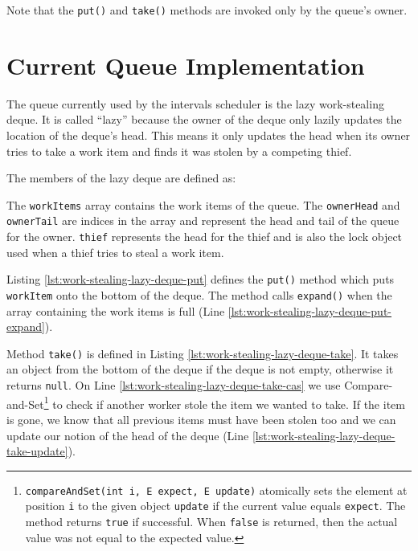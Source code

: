 Note that the \lstinline!put()! and \lstinline!take()! methods are
invoked only by the queue's owner.


\section{Current Queue Implementation}
\label{sec:queues-background-current-implementation}

The queue currently used by the intervals scheduler is the lazy
work-stealing deque. It is called ``lazy'' because the owner of the
deque only lazily updates the location of the deque's head. This means
it only updates the head when its owner tries to take a work item and
finds it was stolen by a competing thief.

The members of the lazy deque are defined as:



The \lstinline!workItems! array contains the work items of the
queue. The \lstinline!ownerHead! and \lstinline!ownerTail! are indices
in the array and represent the head and tail of the queue for the
owner. \lstinline!thief! represents the head for the thief and is also
the lock object used when a thief tries to steal a work item.

Listing \ref{lst:work-stealing-lazy-deque-put} defines the
\lstinline!put()! method which puts \lstinline!workItem! onto the
bottom of the deque. The method calls \lstinline!expand()! when the
array containing the work items is full (Line
\ref{lst:work-stealing-lazy-deque-put-expand}).



\VerbatimFootnotes Method \lstinline!take()! is defined in Listing
\ref{lst:work-stealing-lazy-deque-take}. It takes an object from the
bottom of the deque if the deque is not empty, otherwise it returns
\lstinline!null!. On Line \ref{lst:work-stealing-lazy-deque-take-cas}
we use
Compare-and-Set\footnote{\verb!compareAndSet(int i, E expect, E update)!
  atomically sets the element at position \verb!i! to the given object
  \verb!update! if the current value equals \verb!expect!. The method
  returns \verb!true! if successful. When \verb!false! is returned,
  then the actual value was not equal to the expected value.} to check
if another worker stole the item we wanted to take. If the item is
gone, we know that all previous items must have been stolen too and we
can update our notion of the head of the deque (Line
\ref{lst:work-stealing-lazy-deque-take-update}).

